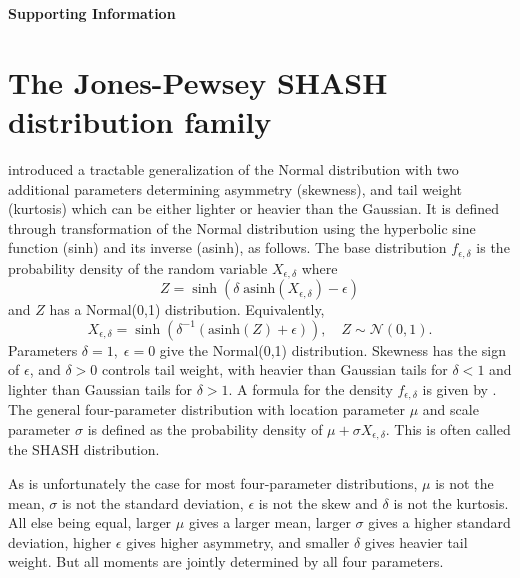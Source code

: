\documentclass[12pt]{article}
\newcommand{\be}{\begin{equation}}
\newcommand{\ee}{\end{equation}}
\begin{document}
\begin{spacing}{1.35} 
\linenumbers
\centerline{\Large{\textbf{Supporting Information}}}

\section{The Jones-Pewsey SHASH distribution family} 
\label{sec:SHASHdist} 
\citet{jones-pewsey-2009} introduced a tractable generalization of the Normal distribution with two additional parameters determining  
asymmetry (skewness), and tail weight (kurtosis) which can be either lighter or heavier than the Gaussian. It is defined through transformation of the
Normal distribution using the hyperbolic sine function (sinh) and its inverse (asinh), as follows. The base distribution $f_{\epsilon,\delta}$  is the 
probability density of the random variable $X_{\epsilon,\delta}$ where  
\be
Z = \sinh (\delta \; \mbox{asinh}(X_{\epsilon,\delta}) - \epsilon)
\label{eqn:JP1}
\ee
and $Z$ has a Normal(0,1) distribution. Equivalently, 
\be
X_{\epsilon,\delta} = \sinh \left( \delta^{-1} (\mbox{asinh}(Z) + \epsilon)\right), \quad Z \sim \mathcal{N}(0,1).
\label{eqn:JP2}
\ee
Parameters $\delta=1, \; \epsilon=0$ give the Normal(0,1) distribution. Skewness has the sign of $\epsilon$, and
$\delta > 0$ controls tail weight, with heavier than Gaussian tails for $\delta<1$ and lighter than Gaussian tails for $\delta > 1$. 
A formula for the density $f_{\epsilon,\delta}$ is given by \citet[][eqn. 2]{jones-pewsey-2009}. 
The general four-parameter distribution with location parameter $\mu$ and scale parameter $\sigma$ is defined as the probability density 
of $\mu + \sigma X_{\epsilon, \delta}$. This is often called the SHASH distribution. 

As is unfortunately the case for most four-parameter distributions, $\mu$ is not the mean, $\sigma$ is not the standard deviation, $\epsilon$ is not
the skew and $\delta$ is not the kurtosis. All else being equal, larger $\mu$ gives a larger mean, larger $\sigma$ gives a higher
standard deviation, higher $\epsilon$ gives higher asymmetry, and smaller $\delta$ gives heavier tail weight. 
But all moments are jointly determined by all four parameters. 


\end{spacing}
\end{document}
